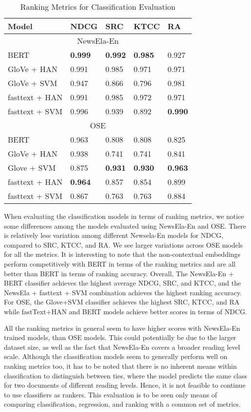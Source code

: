 \documentclass[11pt]{article}
\begin{document}
\begin{table}[htb]
\begin{tabular}{ |p{2.45cm}|p{0.85cm}|p{0.8cm}|p{0.8cm}| p{0.8cm}| }
 \hline
Model & NDCG & SRC &KTCC & RA\\
 \hline
  \multicolumn{5}{|c|}{NewsEla-En} \\
  \hline
BERT   & \textbf{0.999}    & \textbf{0.992} &  \textbf{0.985} & 0.927 \\
GloVe + HAN & 0.991 & 0.985 & 0.971 & 0.971\\
GloVe + SVM & 0.947 & 0.866 & 0.796 & 0.981\\
fasttext + HAN & 0.991 & 0.985 & 0.972 & 0.971\\
fasttext + SVM & 0.996 & 0.939 & 0.892 & \textbf{0.990}\\
\hline
   \multicolumn{5}{|c|}{OSE} \\
 \hline
BERT&  0.963   & 0.808   & 0.808 & 0.825\\
GloVe + HAN & 0.938 & 0.741 & 0.741 & 0.841\\
Glove + SVM & 0.875 & \textbf{0.931} & \textbf{0.930} & \textbf{0.963}\\
fasttext + HAN & \textbf{0.964} & 0.857 & 0.854 & 0.899\\
fasttext + SVM & 0.867 & 0.763 & 0.763 & 0.884\\
 \hline
\end{tabular}
\caption{Ranking Metrics for Classification Evaluation}
\label{tab:rankingclass}
\end{table}
When evaluating the classification models in terms of ranking metrics, we notice some differences among the models evaluated using NewsEla-En and OSE. There is relatively less variation among different Newsela-En models for NDCG, compared to SRC, KTCC, and RA. We see larger variations across OSE models for all the metrics. It is interesting to note that the non-contextual embeddings perform competitively with BERT in terms of the ranking metrics and are all better than BERT in terms of ranking accuracy. Overall, The NewsEla-En + BERT classifier achieves the highest average NDCG, SRC, and KTCC, and the NewsEla + fasttext + SVM combination achieves the highest ranking accuracy. For OSE, the Glove+SVM classifier achieves the highest SRC, KTCC, and RA while fastText+HAN and BERT models achieve better scores in terms of NDCG. 

All the ranking metrics in general seem to have higher scores with NewsEla-En trained models, than OSE models. This could potentially be due to the larger dataset size, as well as the fact that NewsEla-En covers a broader reading level scale. Although the classification models seem to generally perform well on ranking metrics too, it has to be noted that there is no inherent means within classification to distinguish between ties, where the model predicts the same class for two documents of different reading levels. Hence, it is not feasible to continue to use classifiers as rankers. This evaluation is to be seen only means of comparing classification, regression, and ranking with a common set of metrics. 
\end{document}
